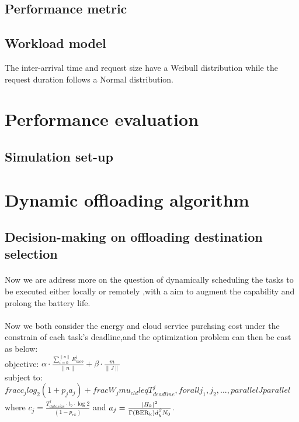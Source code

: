 \documentclass[review]{elsarticle}
\begin{document}
        \subsection{Performance metric}
        \subsection{Workload model}
        The inter-arrival time and request size have a Weibull distribution while the request duration follows a Normal distribution.\cite{iosup2008performance}
        \section{Performance evaluation}
            \subsection{Simulation set-up}
            \paragraph{}
\section{Dynamic offloading algorithm}
    \subsection{Decision-making on offloading destination selection }
    \paragraph{}
    Now we are address more on the question of dynamically scheduling the tasks to be executed either locally or remotely ,with a aim to augment the capability and prolong the battery life.
    \paragraph{}
     Now we both consider the energy and cloud service purchsing cost under the constrain of each task's deadline,and the optimization problem can then be cast as below:\\
      objective: $\alpha \cdot \frac{\sum_{i=0}^{\parallel n\parallel}E_{mob}^i}{\parallel n \parallel} + \beta \cdot \frac{ m}{\parallel J\parallel}$\\
      subject to: $ frac{c_{j}}{log_{2}{(1+p_{j}a_{j})}} +frac{W_{j}}{mu_{cld}} leq T_{deadline}^{j} , forall j_{1},j_{2},...,parallel Jparallel$ \\
    where $c_{j} =\frac{T_{datasize}^j \cdot t_b\cdot \log2}{(1-p_{ek})}  $ and $ a_j=\frac{  \vert H_{k}\vert ^{2}}{\Gamma({\rm BER}_{{\rm k}})d_{k}^{\beta}N_{0}} $.
\end{document}
